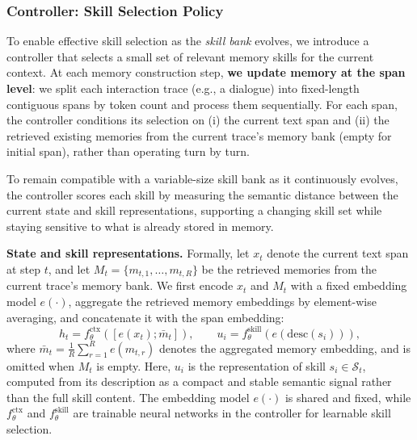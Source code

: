 \subsubsection{Controller: Skill Selection Policy}\label{sec:controller}




To enable effective skill selection as the \emph{skill bank} evolves, we introduce a controller that selects a small set of relevant memory skills for the current context. 
At each memory construction step, \textbf{we update memory at the span level}: we split each interaction trace (e.g., a dialogue) into fixed-length contiguous spans by token count and process them sequentially. For each span, the controller conditions its selection on (i) the current text span and (ii) the retrieved existing memories from the current trace's memory bank (empty for initial span), rather than operating turn by turn.




To remain compatible with a variable-size skill bank as it continuously evolves, the controller scores each skill by measuring the semantic distance between the current state and skill representations, supporting a changing skill set while staying sensitive to what is already stored in memory.




\textbf{State and skill representations.}
Formally, let $x_t$ denote the current text span at step $t$, and let $M_t=\{m_{t,1},\dots,m_{t,R}\}$ be the retrieved memories from the current trace's memory bank. We first encode $x_t$ and $M_t$ with a fixed embedding model $e(\cdot)$, aggregate the retrieved memory embeddings by element-wise averaging, and concatenate it with the span embedding:
\begin{equation}
h_t = f_{\theta}^{\mathrm{ctx}}\!\left([e(x_t);\bar{m}_t]\right), \qquad
u_i = f_{\theta}^{\mathrm{skill}}\!\left(e(\mathrm{desc}(s_i))\right),
\end{equation}
where $\bar{m}_t=\frac{1}{R}\sum_{r=1}^{R}e(m_{t,r})$ denotes the aggregated memory embedding, and is omitted when $M_t$ is empty. Here, $u_i$ is the representation of skill $s_i \in \mathcal{S}_t$, computed from its description as a compact and stable semantic signal rather than the full skill content. The embedding model $e(\cdot)$ is shared and fixed, while $f_{\theta}^{\mathrm{ctx}}$ and $f_{\theta}^{\mathrm{skill}}$ are trainable neural networks in the controller for learnable skill selection.





